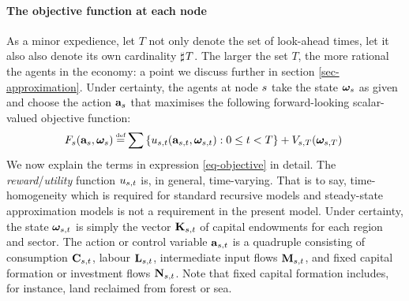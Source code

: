 \documentclass[12pt,a4paper,twoside, draft]{article}
\begin{document}
\paragraph{The objective function at each node}
As a minor expedience, let $T$ not only denote the set of look-ahead times, let
it also also denote its own cardinality $\mathbin{\sharp}\hskip1pt T$.
The larger the set $T$, the more rational the agents in the economy: a point we
discuss further in section \ref{sec-approximation}.
Under certainty, the agents at node ${s}$ take the state
$\boldsymbol{\omega}_{{s}}$ as given and choose the action
$\mathbf{a}_{{s}}$ that maximises
the following forward-looking scalar-valued objective function:
\begin{align}\label{eq-objective} \hskip-3pt   
  F_{\node}
    (\mathbf{a}_{\node}, \boldsymbol{\omega}_{\node}) \defeq
    \sum\left\{
      {u}_{\node, t}(\mathbf{a}_{\node, t}, \boldsymbol{\omega}_{\node, t})
      : 0 \leq t < T
    \right\}
    + {V}_{\node, T}(\boldsymbol{\omega}_{\node, T})
%
\end{align}
We now explain the terms in expression \eqref{eq-objective} in detail.
The \emph{reward}/\emph{utility} function ${u}_{{s}, t}$ is, in general,
time-varying.
That is to say, time-homogeneity which is required for standard recursive
models and steady-state approximation models is not a requirement in the present
model.
Under certainty, the state $\boldsymbol{\omega}_{{s}, t} $ is simply the 
vector $\mathbf{K}_{{s}, t}$ of capital endowments for each region and
sector.
The action or control variable $\mathbf{a}_{{s}, t}$ is a quadruple
consisting of consumption $\mathbf{C}_{{s}, t}$,
labour $\mathbf{L}_{{s}, t}$,
intermediate input flows $\mathbf{M}_{{s}, t}$, and
fixed capital formation or investment flows $\mathbf{N}_{{s}, t}$.
Note that fixed capital formation includes, for instance, land reclaimed from
forest or sea.
\end{document}
